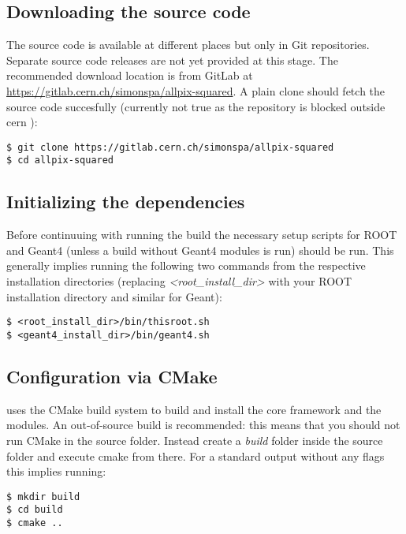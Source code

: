 \subsection{Downloading the source code}
The source code is available at different places but only in Git repositories. Separate source code releases are not yet provided at this stage. The recommended download location is from GitLab at \url{https://gitlab.cern.ch/simonspa/allpix-squared}. A plain clone should fetch the source code succesfully (\todo currently not true as the repository is blocked outside cern \todo):

\begin{verbatim}
$ git clone https://gitlab.cern.ch/simonspa/allpix-squared
$ cd allpix-squared
\end{verbatim}

\subsection{Initializing the dependencies}
\label{sec:initialize_dependencies}
Before continuuing with running the build the necessary setup scripts for ROOT and Geant4 (unless a build without Geant4 modules is run) should be run. This generally implies running the following two commands from the respective installation directories (replacing \textit{\textless root\_install\_dir\textgreater} with your ROOT installation directory and similar for Geant):
\begin{verbatim}
$ <root_install_dir>/bin/thisroot.sh
$ <geant4_install_dir>/bin/geant4.sh
\end{verbatim}

\subsection{Configuration via CMake}
\label{sec:cmake_config}
\apsq uses the CMake build system to build and install the core framework and the modules. An out-of-source build is recommended: this means that you should not run CMake in the source folder. Instead create a \textit{build} folder inside the source folder and execute cmake from there. For a standard output without any flags this implies running:

\begin{verbatim}
$ mkdir build
$ cd build
$ cmake ..
\end{verbatim}

